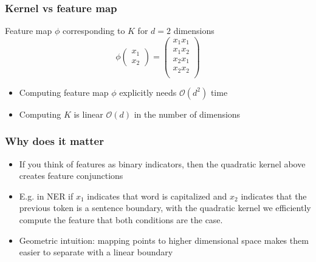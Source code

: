 \documentclass{beamer}
\begin{document}
\begin{frame}
 \frametitle{Kernel vs feature map}
 \begin{block}{Feature map $\phi$ corresponding to $K$ for $d=2$
     dimensions}
 \begin{equation}
  \phi\left(\begin{array}{c}
		x_1\\
		x_2
            \end{array}\right) = \left(
			\begin{array}{c}
 				x_1 x_1 \\
 				x_1 x_2 \\
 				x_2 x_1 \\
 				x_2 x_2 \\
				\end{array}
				\right)
 \end{equation}
\begin{itemize}
\item Computing feature map $\phi$ explicitly needs $\mathcal{O}(d^2)$
  time
\item Computing $K$ is linear $\mathcal{O}(d)$ in the number of
  dimensions
\end{itemize}
\end{block}
\end{frame}

\begin{frame}
 \frametitle{Why does it matter}
\begin{itemize}
\item If you think of features as binary indicators, then the
  quadratic kernel above creates feature conjunctions
\item E.g. in NER if $x_1$ indicates that word is capitalized and
  $x_2$ indicates that the previous token is a sentence boundary, with
  the quadratic kernel we efficiently compute the feature that both
  conditions are the case.
\item Geometric intuition: mapping points to higher dimensional space
  makes them easier to separate with a linear boundary
\end{itemize}
\end{frame}
\end{document}
